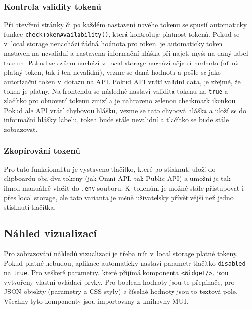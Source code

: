 \documentclass[czech, bc, kiv, he, iso690numb]{fasthesis}
\begin{document}
\subsubsection{Kontrola validity tokenů}

Při otevření stránky či po každém nastavení nového tokenu se spustí automaticky funkce \texttt{checkTokenAvailability()}, která kontroluje platnost tokenů. Pokud se v~local storage nenachází
žádná hodnota pro token, je automaticky token nastaven na nevalidní a nastavena informační hláška při najetí myší na daný label tokeun. Pokud se ovšem nachází v~local storage nachází
nějaká hodnota (ať už platný token, tak i ten nevalidní), vezme se daná hodnota a pošle se jako autorizační token v~dotazu na API. Pokud API vrátí validní data, je zřejmé, že token je platný.
Na frontendu se následně nastaví validita tokenu na \texttt{true} a zlačítko pro obnovení tokenu zmizí a je nahrazeno zelenou checkmark ikonkou. Pokud ale API vrátí chybovou hlášku, 
vezme se tato chybová hláška a uloží se do informační hlášky labelu, token bude stále nevalidní a tlačítko se bude stále zobrazovat. 

\subsubsection{Zkopírování tokenů}

Pro tuto funkcionalitu je vystaveno tlačítko, které po stisknutí uloží do clipboardu oba dva tokeny (jak Omni API, tak Public API) a umožní je tak ihned
manuálně vložit do \texttt{.env} souboru. K~tokenům je možné stále přistupovat i přes local storage, ale tato varianta je méně uživatelsky přívětivější než jedno stisknutí tlačítka.



\subsection{Náhled vizualizací}
Pro zobrazování náhledů vizualizací je třeba mít v~local storage platné tokeny. Pokud platné nebudou, aplikace automaticky nastaví parametr tlačítko
\texttt{disabled} na \texttt{true}. Pro veškeré parametry, které přijímá komponenta \texttt{<Widget/>}, jsou vytvořeny vlastní ovládací prvky.
Pro boolean hodnoty jsou to přepínače, pro JSON objekty (parametry a CSS styly) a číselné hodnoty jsou to textová pole. Všechny tyto komponenty
jsou importovány z~knihovny MUI.
\end{document}
